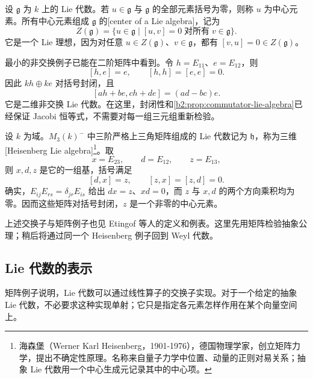 \ProseParagraphBreak
设 \(\mathfrak g\) 为 \(k\) 上的 Lie 代数。若 \(u\in\mathfrak g\) 与 \(\mathfrak g\) 的全部元素括号为零，则称 \(u\) 为中心元素。所有中心元素组成 \(\mathfrak g\) 的[center of a Lie algebra]，记为
\[
	Z(\mathfrak g)=\bigl\{u\in\mathfrak g\mid [u,v]=0\;\text{对所有}\;v\in\mathfrak g\bigr\}.
\]
它是一个 Lie 理想，因为对任意 \(u\in Z(\mathfrak g)\)、\(v\in\mathfrak g\)，都有 \([v,u]=0\in Z(\mathfrak g)\)。

\ProseParagraphBreak
最小的非交换例子已能在二阶矩阵中看到。令 \(h=E_{11}\)、\(e=E_{12}\)，则
\[
	[h,e]=e,\qquad [h,h]=[e,e]=0.
\]
因此 \(kh\oplus ke\) 对括号封闭，且
\[
	[ah+be,ch+de]=(ad-bc)e.
\]
它是二维非交换 Lie 代数。在这里，封闭性和\cref{b2:prop:commutator-lie-algebra}已经保证 Jacobi 恒等式，不需要对每一组三元组重新检验。

\begin{example}\label{b2:exm:heisenberg-lie-algebra}
	设 \(k\) 为域。\(M_3(k)^-\) 中三阶严格上三角矩阵组成的 Lie 代数记为 \(\mathfrak h\)，称为三维[Heisenberg Lie algebra]\footnote{海森堡（Werner Karl Heisenberg，1901-1976），德国物理学家，创立矩阵力学，提出不确定性原理。名称来自量子力学中位置、动量的正则对易关系；抽象 Lie 代数用一个中心生成元记录其中的中心项。}。取
	\[
		x=E_{23},\qquad d=E_{12},\qquad z=E_{13},
	\]
	则 \(x,d,z\) 是它的一组基，括号满足
	\begin{equation}\label{b2:eq:heisenberg-brackets}
		[d,x]=z,\qquad [z,x]=[z,d]=0.
	\end{equation}
	确实，\(E_{ij}E_{rs}=\delta_{jr}E_{is}\) 给出 \(dx=z\)、\(xd=0\)，而 \(z\) 与 \(x,d\) 的两个方向乘积均为零。因而这些矩阵对括号封闭，\(z\) 是一个非零的中心元素。
\end{example}

上述交换子与矩阵例子也见 Etingof 等人的定义和例表\cite[Definition 2.9.1; Example 2.9.2, pp. 22--23]{EtingofEtAl2011RepresentationTheory}。这里先用矩阵检验抽象公理；稍后将通过同一个 Heisenberg 例子回到 Weyl 代数。

\subsection{Lie 代数的表示}
\label{b2:subsec:2004:lie-representations}

矩阵例子说明，Lie 代数可以通过线性算子的交换子实现。对于一个给定的抽象 Lie 代数，不必要求这种实现单射；它只是指定各元素怎样作用在某个向量空间上。

